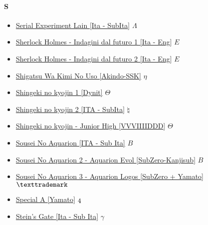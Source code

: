 		\paragraph{S} \hypertarget{SS}{}
			\begin{itemize}
				
				\item \href{https://mega.nz/#F!cXAV3C7Z!qAVJl8gGUXBX5yIIuIPE5w} {Serial Experiment Lain [Ita - SubIta]}  $\varLambda$ \\ 
				\item \href{https://mega.nz/#F!koh2gTZZ!0PycHbZ5dULZjtmCJAlh0w} {Sherlock Holmes - Indagini dal futuro 1 [Ita - Eng]}  $E$ \\ 
				\item \href{https://mega.nz/#F!cxhBATbL!YIc1r4oHAxB_2W2t_Jj17Q} {Sherlock Holmes - Indagini dal futuro 2 [Ita - Eng]}  $E$ \\ 
				\item \href{https://mega.nz/#F!hMlDCBgY!MKdVvQOh4v6fg-mssxH9tg} {Shigatsu Wa Kimi No Uso [Akindo-SSK]}  $\eta$ \\ 
				\item \href{https://mega.nz/#F!NehzEaSC!IrOtCLUWxtPzrf6jtZqxQQ} {Shingeki no kyojin 1 [Dynit]}  $\varTheta$ \\ 
				\item \href{https://mega.nz/#F!InYAzLzb!84pXsbeCxWNIgfCKGyBeDA} {Shingeki no kyojin 2 [ITA - SubIta]}  $\natural$ \\ 
				\item \href{https://mega.nz/#F!kaASAQCL!2w7OryUCZ5p1yGQPm_fsDA} {Shingeki no kyojin - Junior High [VVVIIIIDDD]}  $\varTheta$ \\ 
				\item \href{https://mega.nz/#F!Bc9UTQaD!MgHlE3YozXFn_bu0j8NVDA} {Sousei No Aquarion [ITA - Sub Ita]}  $B$ \\ 
				\item \href{https://mega.nz/#F!tZNFiRAB!mOmUITsy_REKCeMK_4hDVA} {Sousei No Aquarion 2 - Aquarion Evol [SubZero-Kanjisub]}  $B$ \\
				\item \href{https://mega.nz/#F!SqxjkSYS!aojDuut-dqU8qS-jl8vbBA} {Sousei No Aquarion 3 - Aquarion Logos [SubZero + Yamato]}  $\texttrademark$ \\
				\item \href{https://mega.nz/#F!qKxQGaZS!NiHehV5AT8nmHfTb4HO1cg} {Special A [Yamato]}  $\oldstylenums{4}$ \\
				\item \href{https://mega.nz/#F!Ax4FFL6S!x1J7t3n46PWAuZb8gnldxQ} {Stein's Gate [Ita - Sub Ita]}  $\gamma$ \\ 

\end{itemize}
